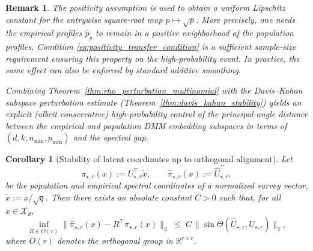 \documentclass[preprint,11pt]{elsarticle}
\newcommand{\xr}[1]{{ \color{orange}{[XR - #1]}}}
\newtheorem{Corollary}[Theorem]{Corollary}
\newtheorem{Remark}[Theorem]{Remark}
\newcommand{\R}{\mathbb{R}}
\begin{document}
\begin{Remark}
    The positivity assumption is used to obtain a uniform Lipschitz constant for the entrywise square-root map $p\mapsto \sqrt p$.
    More precisely, one needs the empirical profiles $\widehat p_y$ to remain in a positive neighborhood of the population profiles.
    Condition \eqref{eq:positivity_transfer_condition} is a sufficient sample-size requirement ensuring this property on the high-probability event.
    In practice, the same effect can also be enforced by standard additive smoothing.

    
    Combining Theorem~\ref{thm:rho_perturbation_multinomial} with the Davis--Kahan subspace perturbation estimate
    (Theorem~\ref{thm:davis_kahan_stability}) yields an explicit (albeit conservative) high-probability control of the principal-angle distance
    between the empirical and population DMM embedding subspaces in terms of $(d,k,n_{\min},p_{\min})$ and the spectral gap.
\end{Remark}

\begin{Corollary}[Stability of latent coordinates up to orthogonal alignment]
\label{cor:latent_coordinate_stability}
Let
\[
\pi_{\star,r}(x):=U_{\star,r}^\top \widetilde x,
\qquad
\widehat\pi_{\star,r}(x):=\widehat U_{\star,r}^\top,
\]
be the population and empirical spectral coordinates of a normalized survey vector,  $\widetilde x:=x/\sqrt q$.
Then there exists an absolute constant $C>0$ such that, for all $x\in\mathcal X_d$,
\[
\inf_{R\in O(r)}
\bigl\|\widehat\pi_{\star,r}(x)-R^\top\pi_{\star,r}(x)\bigr\|_2
\;\le\;
C\,\bigl\|\sin\Theta(\widehat U_{\star,r},U_{\star,r})\bigr\|_2,
\]
where $O(r)$ denotes the orthogonal group in $\R^{r\times r}$.
\end{Corollary}
\end{document}
